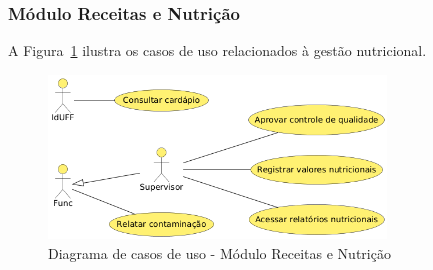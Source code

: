 \documentclass[12pt,a4paper]{article}
\begin{document}
\subsubsection{Módulo Receitas e Nutrição}
A Figura~\ref{fig:diagrama_nutricao} ilustra os casos de uso relacionados à gestão nutricional.

\begin{figure}[htbp]
    \centering
    \includegraphics[width=0.8\textwidth]{diagramas/diagrama-nutricao.png}
    \caption{Diagrama de casos de uso - Módulo Receitas e Nutrição}
    \label{fig:diagrama_nutricao}
\end{figure}
\end{document}
